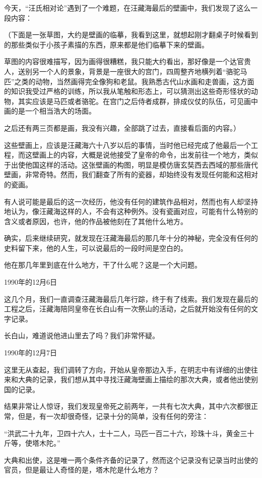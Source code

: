 今天，“汪氏相对论”遇到了一个难题，在汪藏海最后的壁画中，我们发现了这么一段内容：

（下面是一张草图，大约是壁画的临摹，我看到这里，就想起刚才翻桌子时候看到的那些类似于小孩子素描的东西，原来都是他们临摹下来的壁画。

草图的内容很难描写，因为画得很糟糕，我只能大约看出，那好像是一个达官贵人，送别另一个人的景象，背景是一座很大的宫门，四周整齐地横列着“骆驼马匹”之类的动物，当然画得完全像狗和老鼠。我熟悉古代山水画和走兽画，这方面的知识我受过严格的训练，所以我从笔触和形态上，可以猜测出这些奇形怪状的动物，其实应该是马匹或者骆驼。在宫门之后侍者成群，排成仪仗的队伍，可见画中画的是一个相当浩大的场面。

之后还有两三页都是画，我没有兴趣，全部跳了过去，直接看后面的内容。）

这些壁画上，应该是汪藏海六十八岁以后的事情，当时他已经完成了他最后一个工程，而这壁画上的内容，大概是说他接受了皇帝的命令，出发前往一个地方，类似于出使他国这样的活动。这张壁画的构图，明显是模仿唐玄奘西去西域的那些唐代壁画，非常奇特。然而，我们翻查了所有的瓷器，却始终没有发现任何能和这相对的瓷画。

有人说可能是最后的这一次经历，他没有任何的建筑作品相对，然而也有人却坚持地认为，像汪藏海这样的人，不会有这种例外。没有瓷画对应，可能有什么特别的含义或者原因，也许，他的作品被他刻在了其他什么地方。

确实，后来继续研究，就发现在汪藏海最后的那几年十分的神秘，完全没有任何的史料留下来，他的人生，可以说最后的一段时间是空白的。

他在那几年里到底在什么地方，干了什么呢？这是一个大问题。

1990年的12月6日

这几个月，我们一直调查汪藏海最后几年行踪，终于有了线索。我们发现在最后的工程之后，汪藏海陪同皇帝在长白山有一次祭山的活动，之后就开始没有任何的文字记录。

长白山，难道说他进山里去了吗？我们非常怀疑。

1990年的12月7日

这里无从查起，我们调转了方向，开始从皇帝那边入手，在明志中有详细的出使往来和大典的记录，我们想从其中寻找汪藏海壁画上描绘的那次大典，或者他出使别国的记录。

结果非常让人惊讶，我们发现皇帝死之前两年，一共有七次大典，其中六次都很正常，但是，有一次却很奇怪，记录十分的简单，没有任何的旁注：

“洪武二十九年，卫四十六人，士十二人，马匹一百二十六，珍珠十斗，黄金三十斤等，使塔木陀。”

大典和出使，这是唯一两个条件齐备的记录了，然而这个记录没有记录当时出使的官员，但是最让人奇怪的是，塔木陀是什么地方？

